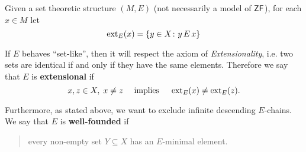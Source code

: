 Given a set theoretic structure $(M,E)$ (not necessarily a model of $\mathsf{ZF}$), for each $x \in M$ let
\begin{equation*}
\operatorname{ext}_E(x) = \{ y \in X \colon y\, E \, x \}
\end{equation*}

If $E$ behaves ``set-like'', then it will respect the axiom of \textit{Extensionality}, i.e. two sets are identical if and only if they have the same elements. Therefore we say that $E$ is \textbf{extensional} if
\begin{equation*}
x,z \in X, \; x\neq z \quad \text{ implies } \quad \operatorname{ext}_E(x) \neq \operatorname{ext}_E(z).
\end{equation*}

Furthermore, as stated above, we want to exclude infinite descending $E$-chains. We say that $E$ is \textbf{well-founded} if

\begin{quote}
every non-empty set $Y \subseteq X$ has an $E$-minimal element.
\end{quote}

